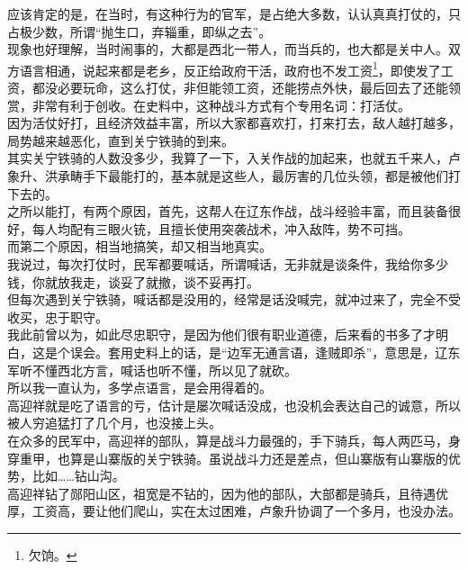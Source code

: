 \begin{multicols}{\theparacolNo}
应该肯定的是，在当时，有这种行为的官军，是占绝大多数，认认真真打仗的，只占极少数，所谓“抛生口，弃辎重，即纵之去”。\\

现象也好理解，当时闹事的，大都是西北一带人，而当兵的，也大都是关中人。双方语言相通，说起来都是老乡，反正给政府干活，政府也不发工资\footnote{欠饷。}，即使发了工资，都没必要玩命，这么打仗，非但能领工资，还能捞点外快，最后回去了还能领赏，非常有利于创收。在史料中，这种战斗方式有个专用名词：打活仗。\\

因为活仗好打，且经济效益丰富，所以大家都喜欢打，打来打去，敌人越打越多，局势越来越恶化，直到关宁铁骑的到来。\\

其实关宁铁骑的人数没多少，我算了一下，入关作战的加起来，也就五千来人，卢象升、洪承畴手下最能打的，基本就是这些人，最厉害的几位头领，都是被他们打下去的。\\

之所以能打，有两个原因，首先，这帮人在辽东作战，战斗经验丰富，而且装备很好，每人均配有三眼火铳，且擅长使用突袭战术，冲入敌阵，势不可挡。\\

而第二个原因，相当地搞笑，却又相当地真实。\\

我说过，每次打仗时，民军都要喊话，所谓喊话，无非就是谈条件，我给你多少钱，你就放我走，谈妥了就撤，谈不妥再打。\\

但每次遇到关宁铁骑，喊话都是没用的，经常是话没喊完，就冲过来了，完全不受收买，忠于职守。\\

我此前曾以为，如此尽忠职守，是因为他们很有职业道德，后来看的书多了才明白，这是个误会。套用史料上的话，是“边军无通言语，逢贼即杀”，意思是，辽东军听不懂西北方言，喊话也听不懂，所以见了就砍。\\

所以我一直认为，多学点语言，是会用得着的。\\

高迎祥就是吃了语言的亏，估计是屡次喊话没成，也没机会表达自己的诚意，所以被人穷追猛打了几个月，也没接上头。\\

在众多的民军中，高迎祥的部队，算是战斗力最强的，手下骑兵，每人两匹马，身穿重甲，也算是山寨版的关宁铁骑。虽说战斗力还是差点，但山寨版有山寨版的优势，比如……钻山沟。\\

高迎祥钻了郧阳山区，祖宽是不钻的，因为他的部队，大部都是骑兵，且待遇优厚，工资高，要让他们爬山，实在太过困难，卢象升协调了一个多月，也没办法。\\


\end{multicols}
